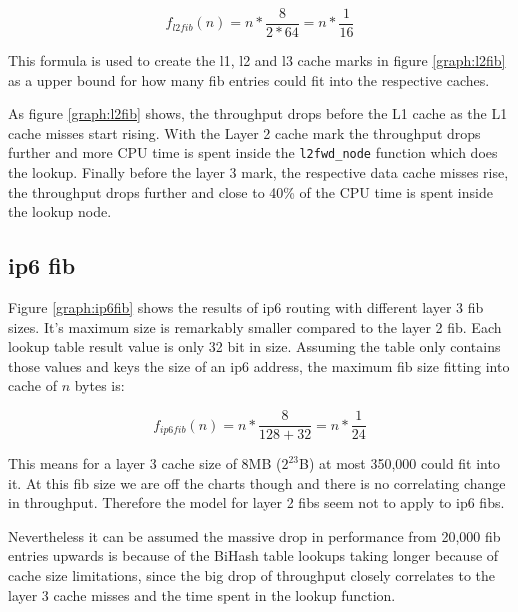 $$ f_{l2fib}(n) = n * \frac{8}{2 * 64} = n * \frac{1}{16}  $$

This formula is used to create the l1, l2 and l3 cache marks in figure
\ref{graph:l2fib} as a upper bound for how many fib entries could fit
into the respective caches. 

As figure \ref{graph:l2fib} shows, the throughput drops before the L1
cache as the L1 cache misses start rising. With the Layer 2 cache mark
the throughput drops further and more CPU time is spent inside the
\lstinline|l2fwd_node| function which does the lookup. Finally before
the layer 3 mark, the respective data cache misses rise, the
throughput drops further and close to 40\% of the CPU time is spent
inside the lookup node.





\subsection{\Ac{ip6} \Ac{fib}}

Figure \ref{graph:ip6fib} shows the results of \Ac{ip6} routing with
different layer 3 \Ac{fib} sizes. It's maximum size is remarkably
smaller compared to the layer 2 \Ac{fib}. Each lookup table result
value is only 32 bit in size. Assuming the table only contains those
values and keys the size of an \Ac{ip6} address, the maximum \Ac{fib}
size fitting into cache of $n$ bytes is:

$$ f_{ip6fib}(n) = n * \frac{8}{128 + 32} = n * \frac{1}{24}  $$

This means for a layer 3 cache size of 8MB ($2^{23}$B) at most 350,000
could fit into it. At this \Ac{fib} size we are off the charts though
and there is no correlating change in throughput. Therefore the model
for layer 2 \Ac{fib}s seem not to apply to \Ac{ip6} \Ac{fib}s.



Nevertheless it can be assumed the massive drop in performance from
20,000 \Ac{fib} entries upwards is because of the BiHash table lookups
taking longer because of cache size limitations, since the big drop of
throughput closely correlates to the layer 3 cache misses and the time
spent in the lookup function.







